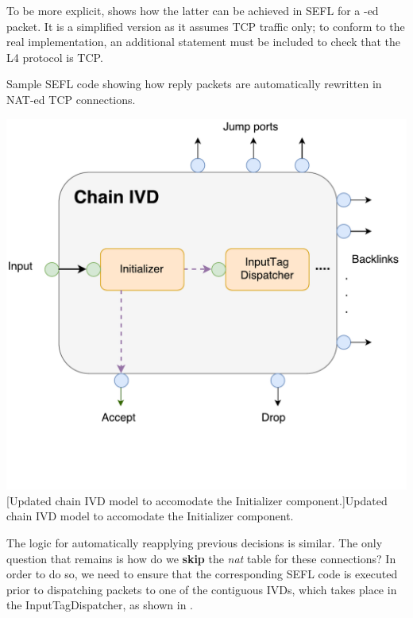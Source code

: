 To be more explicit,  shows how the
latter can be achieved in SEFL for a \SNAT-ed packet.  It is a simplified
version as it assumes TCP traffic only; to conform to the real implementation,
an additional  statement must be included to check that the L4
protocol is TCP.

\begin{minipage}{.6\textwidth}
\begin{listing}[H]
  \caption{Sample SEFL code showing how reply packets are automatically
  rewritten in NAT-ed TCP connections.}
  \label{lst:nat-reply-sefl}
\end{listing}
\end{minipage}\hfill
\begin{minipage}{.36\textwidth}
  \centering
  \includegraphics[scale=0.3]{src/img/chain-internal-initializer}
  [Updated chain IVD model to accomodate the Initializer
  component.]{Updated chain IVD model to accomodate the Initializer component.}
  \label{fig:chain-internal-initializer}
\end{minipage}

\bigskip

The logic for automatically reapplying previous decisions is similar.  The only
question that remains is how do we \textbf{skip} the \emph{nat} table for these
connections?  In order to do so, we need to ensure that the corresponding SEFL
code is executed prior to dispatching packets to one of the contiguous IVDs,
which takes place in the InputTagDispatcher, as shown in
.

